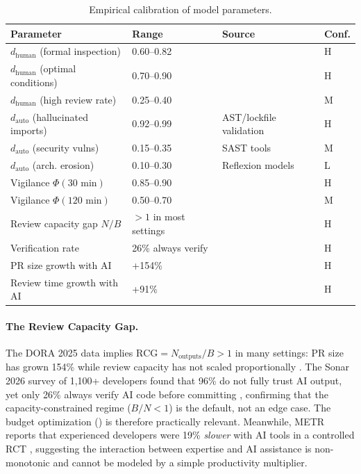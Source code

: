 \documentclass[11pt, a4paper, copyright]{googledeepmind}
\begin{document}
\begin{table}[t]
\centering
\caption{Empirical calibration of model parameters.}
\label{tab:empirical}
\small
\begin{tabular}{llll}
\toprule
\textbf{Parameter} & \textbf{Range} & \textbf{Source} & \textbf{Conf.} \\
\midrule
$d_{\text{human}}$ (formal inspection) & 0.60--0.82 & \citet{fagan1976design, jones1996software} & H \\
$d_{\text{human}}$ (optimal conditions) & 0.70--0.90 & \citet{cohen2006best} & H \\
$d_{\text{human}}$ (high review rate) & 0.25--0.40 & \citet{cohen2006best} & M \\
$d_{\text{auto}}$ (hallucinated imports) & 0.92--0.99 & AST/lockfile validation & H \\
$d_{\text{auto}}$ (security vulns) & 0.15--0.35 & SAST tools & M \\
$d_{\text{auto}}$ (arch. erosion) & 0.10--0.30 & Reflexion models & L \\
Vigilance $\Phi(30\text{ min})$ & 0.85--0.90 & \citet{mackworth1948breakdown} & H \\
Vigilance $\Phi(120\text{ min})$ & 0.50--0.70 & \citet{mackworth1948breakdown} & M \\
Review capacity gap $N/B$ & $>1$ in most settings & \citet{dora2025} & H \\
Verification rate & 26\% always verify & \citet{sonar2026} & H \\
PR size growth with AI & +154\% & \citet{dora2025} & H \\
Review time growth with AI & +91\% & \citet{dora2025} & H \\
\bottomrule
\end{tabular}
\end{table}

\paragraph{The Review Capacity Gap.} The DORA 2025 data implies $\text{RCG} = N_{\text{outputs}} / B > 1$ in many settings: PR size has grown 154\% while review capacity has not scaled proportionally \citep{dora2025}. The Sonar 2026 survey of 1,100+ developers found that 96\% do not fully trust AI output, yet only 26\% always verify AI code before committing \citep{sonar2026}, confirming that the capacity-constrained regime ($B/N < 1$) is the default, not an edge case. The budget optimization () is therefore practically relevant. Meanwhile, METR reports that experienced developers were 19\% \emph{slower} with AI tools in a controlled RCT \citep{metr2026}, suggesting the interaction between expertise and AI assistance is non-monotonic and cannot be modeled by a simple productivity multiplier.
\end{document}
